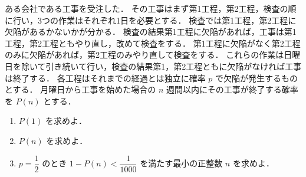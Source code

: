 ある会社である工事を受注した．
その工事はまず第1工程，第2工程，検査の順に行い，3つの作業はそれぞれ1日を必要とする．
検査では第1工程，第2工程に欠陥があるかないかが分かる．
検査の結果第1工程に欠陥があれば，工事は第1工程，第2工程ともやり直し，改めて検査をする．
第1工程に欠陥がなく第2工程のみに欠陥があれば，第2工程のみやり直して検査をする．
これらの作業は日曜日を除いて引き続いて行い，検査の結果第1，第2工程ともに欠陥がなければ工事は終了する．
各工程はそれまでの経過とは独立に確率 $p$ で欠陥が発生するものとする．
月曜日から工事を始めた場合の $n$ 週間以内にその工事が終了する確率を $P(n)$ とする．

\begin{enumerate}
  \item $P(1)$ を求めよ．
  \item $P(n)$ を求めよ．
  \item $p = \dfrac{1}{2}$ のとき $1 - P(n) < \dfrac{1}{1000}$ を満たす最小の正整数 $n$ を求めよ．
\end{enumerate}
